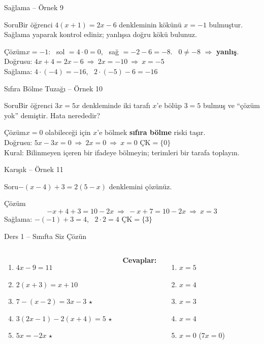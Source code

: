\documentclass[aspectratio=169,11pt]{beamer}
\newcommand{\soru}[3]{%
\begin{frame}{#1}
  \begin{block}{Soru}\large #2\end{block}
  \pause
  \begin{exampleblock}{Çözüm}\large #3\end{exampleblock}
\end{frame}}
\begin{document}
\soru{Sağlama -- Örnek 9}
{Bir öğrenci \(4(x+1)=2x-6\) denkleminin kökünü \(x=-1\) bulmuştur. Sağlama yaparak kontrol ediniz; yanlışsa doğru kökü bulunuz.}
{\(x=-1\): \ sol \(=4\cdot 0=0\), \ sağ \(=-2-6=-8\). \ \(0\neq-8\) \(\Rightarrow\) \textbf{yanlış}.\\[3pt]
Doğrusu: \(4x+4=2x-6\ \Rightarrow\ 2x=-10\ \Rightarrow\ x=-5\)\\[3pt]
Sağlama: \(4\cdot(-4)=-16\), \ \(2\cdot(-5)-6=-16\) \checkmark}

\soru{Sıfıra Bölme Tuzağı -- Örnek 10}
{Bir öğrenci \(3x=5x\) denkleminde iki tarafı \(x\)'e bölüp \(3=5\) bulmuş ve ``çözüm yok'' demiştir. Hata nerededir?}
{\(x=0\) olabileceği için \(x\)'e bölmek \textbf{sıfıra bölme} riski taşır.\\[3pt]
Doğrusu: \(5x-3x=0\ \Rightarrow\ 2x=0\ \Rightarrow\ x=0\) \qquad \(\text{ÇK}=\{0\}\)\\[3pt]
Kural: Bilinmeyen içeren bir ifadeye bölmeyin; terimleri bir tarafa toplayın.}

\soru{Karışık -- Örnek 11}
{\(-(x-4)+3=2(5-x)\) denklemini çözünüz.}
{\[-x+4+3=10-2x\ \Rightarrow\ -x+7=10-2x\ \Rightarrow\ x=3\]
Sağlama: \(-(-1)+3=4\), \ \(2\cdot 2=4\) \checkmark \qquad \(\text{ÇK}=\{3\}\)}

\begin{frame}{Ders 1 -- Sınıfta Siz Çözün}
\begin{columns}[t]
\begin{enumerate}
\item \(4x-9=11\)
\item \(2(x+3)=x+10\)
\item \(7-(x-2)=3x-3\) \(\star\)
\item \(3(2x-1)-2(x+4)=5\) \(\star\)
\item \(5x=-2x\) \(\star\)
\end{enumerate}
\pause
\textbf{Cevaplar:}
\begin{enumerate}
\item \(x=5\)
\item \(x=4\)
\item \(x=3\)
\item \(x=4\)
\item \(x=0\) \quad (\(7x=0\))
\end{enumerate}
\end{columns}
\vspace{4pt}{\footnotesize \(\star\) işaretli soruların adım adım çözümü sonraki slaytlardadır.}
\end{frame}
\end{document}
